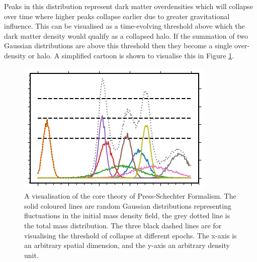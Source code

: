 Peaks in this distribution represent dark matter overdensities which will collapse over time where higher peaks collapse earlier due to greater gravitational influence. This can be visualised as a time-evolving threshold above which the dark matter density would qualify as a collapsed halo. If the summation of two Gaussian distributions are above this threshold then they become a single over-density or halo. A simplified cartoon is shown to visualise this in Figure \ref{fig:PS_Cartoon}.

\begin{figure}[h]
    \centering
    \includegraphics[width = \linewidth]{Figures/Chapter1/PS_Cartoon.png}
    \caption{A visualisation of the core theory of Press-Schechter Formalism. The solid coloured lines are random Gaussian distributions representing fluctuations in the initial mass density field, the grey dotted line is the total mass distribution. The three black dashed lines are for visualising the threshold of collapse at different epochs. The x-axis is an arbitrary spatial dimension, and the y-axis an arbitrary density unit.}
    \label{fig:PS_Cartoon}
\end{figure}

